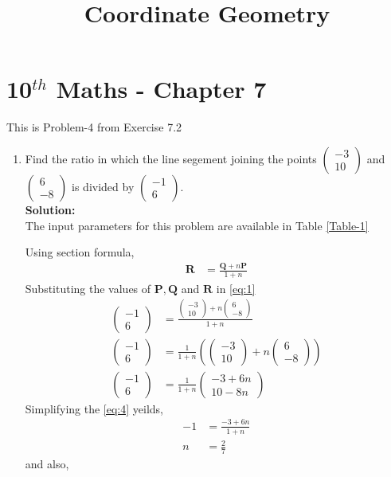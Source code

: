\documentclass[12pt]{article}
\providecommand{\brak}[1]{\ensuremath{\left(#1\right)}}
\newcommand{\solution}{\noindent \textbf{Solution: }}
\newcommand{\myvec}[1]{\ensuremath{\begin{pmatrix}#1\end{pmatrix}}}
\let\vec\mathbf
\begin{document}
\begin{center}
\title{\textbf{Coordinate Geometry}}
\date{\vspace{-5ex}} %
\maketitle
\end{center}
\setcounter{page}{1}
\section*{10$^{th}$ Maths - Chapter 7}
This is Problem-4 from Exercise 7.2
\begin{enumerate}
\item Find the ratio in which the line segement joining the points $\myvec{-3 \\ 10}$ and $\myvec{6\\-8}$ is divided by $\myvec{-1\\6}$.\\
\solution \\The input parameters for this problem are available in Table \eqref{Table-1}
\begin{table}[ht!]

\caption{}
\label{Table-1} 
\end{table}
Using section formula,
\begin{align}
         \vec{R} &=\frac{\vec{Q}+n\vec{P}}{1+n}\label{eq:1}
\end{align}
Substituting the values of $\vec{P},\vec{Q}$ and $\vec{R}$ in \eqref{eq:1}
\begin{align}
         \myvec{-1\\6} &=\frac{{\myvec{-3\\10}+n\myvec{6\\-8}}}{1+n}\\
         \myvec{-1\\6} &=\frac{1}{1+n}\brak{{\myvec{-3\\10}+n\myvec{6\\-8}}} \\
         \myvec{-1\\6} &=\frac{1}{1+n}\myvec{-3+6n\\10-8n} \label{eq:4}
\end{align}
Simplifying the \eqref{eq:4} yeilds,
\begin{align}
          -1 &=\frac{-3+6n}{1+n}\\
          n &=\frac{2}{7}
\end{align}
and also,

\end{enumerate}
\end{document}
